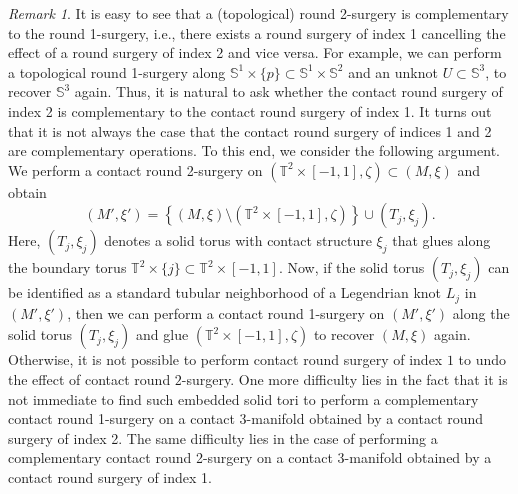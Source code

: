 \documentclass{amsart}
\theoremstyle{plain}
\theoremstyle{remark}
\newtheorem{rem}{Remark}
\theoremstyle{definition}
\newcommand{\s}{\mathbb{S}}
\begin{document}
\begin{rem}
It is easy to see that a (topological) round 2-surgery is complementary to the round 1-surgery, i.e., there exists a round surgery of index 1 cancelling the effect of a round surgery of index 2 and vice versa. 
For example, we can perform a topological round 1-surgery along $\s^1 \times \{p\} \subset \s^1 \times \s^2$ and an unknot $U \subset \s^3$, to recover $\s^3$ again.
Thus, it is natural to ask whether the contact round surgery of index 2 is complementary to the contact round surgery of index 1. It turns out that it is not always the case that the contact round surgery of indices 1 and 2 are complementary operations. To this end, we consider the following argument. 
We perform a contact round 2-surgery on $\left(\mathbb{T}^2 \times [-1,1], \zeta\right) \subset (M, \xi)$ and obtain 
$$ (M', \xi')= \left\{(M, \xi) \setminus \left(\mathbb{T}^2 \times [-1,1], \zeta\right)\right\} \cup  \left(T_j, \xi_j\right). $$
Here, $\left(T_j, \xi_j\right)$ denotes a solid torus with contact structure $\xi_j$ that glues along the boundary torus $\mathbb{T}^2 \times \{j\} \subset \mathbb{T}^2 \times [-1,1]$. 
Now, if the solid torus $\left(T_{j}, \xi_{j}\right)$ can be identified as a standard tubular neighborhood of a Legendrian knot $L_j$ in $\left(M', \xi'\right)$, then we can perform a contact round 1-surgery on $\left(M', 
\xi'\right)$ along the solid torus $\left(T_{j}, \xi_{j}\right)$ and glue $\left(\mathbb{T}^2 \times [-1,1], \zeta\right)$ to recover $(M, \xi)$ again. Otherwise, it is not possible to perform contact round surgery of index $1$ to undo the effect of contact round $2$-surgery.
One more difficulty lies in the fact that it is not immediate to find such embedded solid tori to perform a complementary contact round 1-surgery on a contact 3-manifold obtained by a contact round surgery of index 2.
The same difficulty lies in the case of performing a complementary contact round 2-surgery on a contact 3-manifold obtained by a contact round surgery of index 1.   
\end{rem}


\end{document}
